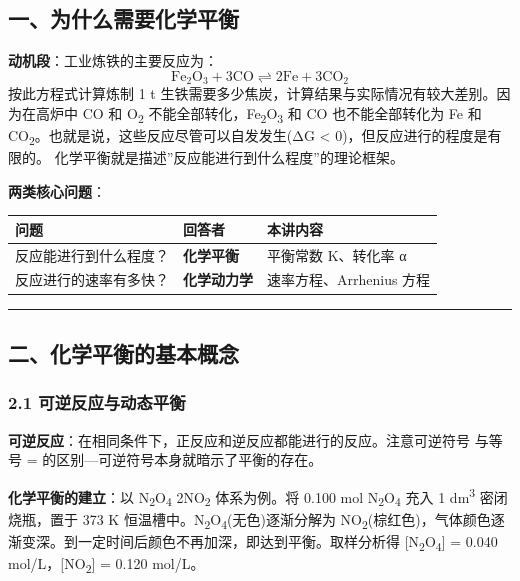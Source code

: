 \subsection{一、为什么需要化学平衡}\label{ux4e00ux4e3aux4ec0ux4e48ux9700ux8981ux5316ux5b66ux5e73ux8861}

\textbf{动机段}：工业炼铁的主要反应为：
\[\mathrm{Fe_2O_3 + 3CO \rightleftharpoons 2Fe + 3CO_2}\]
按此方程式计算炼制 1 t 生铁需要多少焦炭，计算结果与实际情况有较大差别。因为在高炉中 CO 和 O\textsubscript{2} 不能全部转化，Fe\textsubscript{2}O\textsubscript{3} 和 CO 也不能全部转化为 Fe 和 CO\textsubscript{2}。也就是说，这些反应尽管可以自发发生(ΔG \textless{} 0)，但反应进行的程度是有限的。
化学平衡就是描述''反应能进行到什么程度''的理论框架。

\textbf{两类核心问题}：

{\def\LTcaptype{none} %
\begin{longtable}[]{@{}lll@{}}
\toprule\noalign{}
问题 & 回答者 & 本讲内容 \\
\midrule\noalign{}
\endhead
\bottomrule\noalign{}
\endlastfoot
反应能进行到什么程度？ & \textbf{化学平衡} & 平衡常数 K、转化率 α \\
反应进行的速率有多快？ & \textbf{化学动力学} & 速率方程、Arrhenius 方程 \\
\end{longtable}
}

\begin{center}\rule{0.5\linewidth}{0.5pt}\end{center}

\subsection{二、化学平衡的基本概念}\label{ux4e8cux5316ux5b66ux5e73ux8861ux7684ux57faux672cux6982ux5ff5}

\subsubsection{2.1 可逆反应与动态平衡}\label{ux53efux9006ux53cdux5e94ux4e0eux52a8ux6001ux5e73ux8861}

\textbf{可逆反应}：在相同条件下，正反应和逆反应都能进行的反应。注意可逆符号 \衡 与等号 = 的区别---可逆符号本身就暗示了平衡的存在。

\textbf{化学平衡的建立}：以 N\textsubscript{2}O\textsubscript{4} \衡 2NO\textsubscript{2} 体系为例。将 0.100 mol N\textsubscript{2}O\textsubscript{4} 充入 1 dm\textsuperscript{3} 密闭烧瓶，置于 373 K 恒温槽中。N\textsubscript{2}O\textsubscript{4}(无色)逐渐分解为 NO\textsubscript{2}(棕红色)，气体颜色逐渐变深。到一定时间后颜色不再加深，即达到平衡。取样分析得 {[}N\textsubscript{2}O\textsubscript{4}{]} = 0.040 mol/L，{[}NO\textsubscript{2}{]} = 0.120 mol/L。

